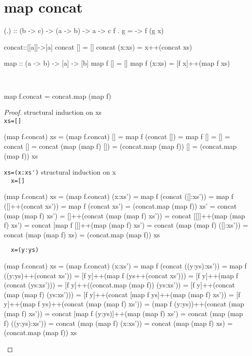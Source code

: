 \section{map concat}
\begin{code}
(.) :: (b -> c) -> (a -> b) -> a -> c
f . g = \x -> f (g x)
\end{code}
\begin{code}
concat::[[a]]->[a]
concat []     = []
concat (x:xs) = x++(concat xs)
\end{code}
\begin{code}
map :: (a -> b) -> [a] -> [b] 
map f []     = []
map f (x:xs) = [f x]++(map f xs)
\end{code}
\begin{claim}\ 
\begin{code}
map f.concat = concat.map (map f)
\end{code}
\end{claim}
\begin{proof}structural induction on xs\\
\verb|xs=[]|
\begin{code}
(map f.concat) xs = (map f.concat) []
                  = map f (concat [])
                  = map f []
                  = []
                  = concat []
                  = concat (map (map f) [])
                  = (concat.map (map f)) []
                  = (concat.map (map f)) xs
\end{code}
\verb|xs=(x:xs')|
structural induction on x\\
\verb|  x=[]|
\begin{code}
(map f.concat) xs = (map f.concat) (x:xs')
                  = map f (concat ([]:xs'))
                  = map f ([]++(concat xs'))
                  = map f (concat xs')
                  = (concat.map (map f)) xs'
                  = concat (map (map f) xs')
                  = []++(concat (map (map f) xs'))
                  = concat [[]]++(map (map f) xs')
                  = concat [map f []]++(map (map f) xs')
                  = concat (map (map f) ([]:xs'))
                  = concat (map (map f) xs)
                  = (concat.map (map f)) xs
\end{code}
\verb|  x=(y:ys)|
\begin{code}
(map f.concat) xs = (map f.concat) (x:xs')
                  = map f (concat ((y:ys):xs'))
                  = map f ((y:ys)++(concat xs'))
                  = [f y]++(map f (ys++(concat xs')))
                  = [f y]++(map f (concat (ys:xs')))
                  = [f y]++((concat.map (map f)) (ys:xs'))
                  = [f y]++(concat (map (map f) (ys:xs')))
                  = [f y]++(concat [map f ys]++(map (map f) xs'))
                  = [f y]++(map f ys)++(concat (map (map f) xs'))
                  = (map f (y:ys))++(concat (map (map f) xs'))
                  = concat [map f (y:ys)]++(map (map f) xs')
                  = concat (map (map f) ((y:ys):xs'))
                  = concat (map (map f) (x:xs'))
                  = concat (map (map f) xs)
                  = (concat.map (map f)) xs
\end{code}
\end{proof}
